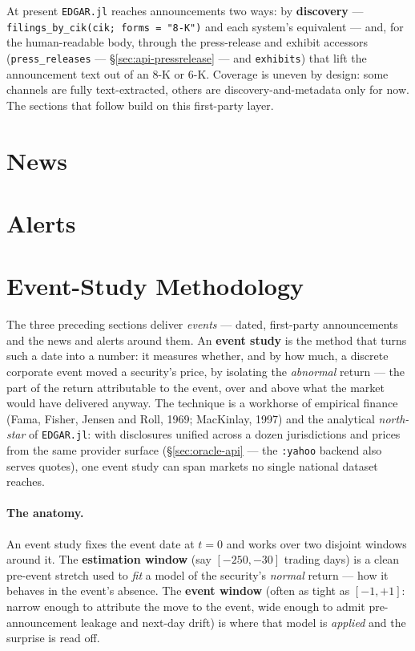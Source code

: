 \documentclass[11pt,a4paper]{report}
\begin{document}
At present \texttt{EDGAR.jl} reaches announcements two ways: by \textbf{discovery} ---
\texttt{filings\_by\_cik(cik; forms = "8-K")} and each system's equivalent --- and, for the human-readable
body, through the press-release and exhibit accessors (\texttt{press\_releases} --- \S\ref{sec:api-pressrelease} --- and \texttt{exhibits}) that
lift the announcement text out of an 8-K or 6-K. Coverage is uneven by design: some channels are fully
text-extracted, others are discovery-and-metadata only for now. The sections that follow build on this
first-party layer.

\section{News}
\section{Alerts}
\section{Event-Study Methodology}\label{sec:event-study}

The three preceding sections deliver \emph{events} --- dated, first-party announcements and the news and
alerts around them. An \textbf{event study} is the method that turns such a date into a number: it measures
whether, and by how much, a discrete corporate event moved a security's price, by isolating the
\emph{abnormal} return --- the part of the return attributable to the event, over and above what the market
would have delivered anyway. The technique is a workhorse of empirical finance (Fama, Fisher, Jensen and
Roll, 1969; MacKinlay, 1997) and the analytical \emph{north-star} of \texttt{EDGAR.jl}: with disclosures
unified across a dozen jurisdictions and prices from the same provider surface (\S\ref{sec:oracle-api} --- the
\texttt{:yahoo} backend also serves quotes), one event study can span markets no single national dataset
reaches.

\paragraph{The anatomy.} An event study fixes the event date at $t = 0$ and works over two disjoint windows
around it. The \textbf{estimation window} (say $[-250,-30]$ trading days) is a clean pre-event stretch used to
\emph{fit} a model of the security's \emph{normal} return --- how it behaves in the event's absence. The
\textbf{event window} (often as tight as $[-1,+1]$: narrow enough to attribute the move to the event, wide
enough to admit pre-announcement leakage and next-day drift) is where that model is \emph{applied} and the
surprise is read off.
\end{document}

